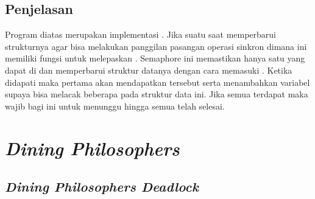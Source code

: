 \documentclass[11pt,a4paper]{article}
\begin{document}
    \subsection{Penjelasan}
    Program diatas merupakan implementasi . Jika  suatu saat memperbarui strukturnya agar bisa melakukan panggilan pasangan operasi sinkron  dimana ini memiliki fungsi untuk melepaskan . Semaphore  ini memastikan hanya satu  yang dapat di  dan memperbarui struktur datanya dengan cara memasuki . Ketika  didapati maka  pertama akan mendapatkan  tersebut serta menambahkan variabel  supaya bisa melacak beberapa  pada struktur data ini. Jika semua  terdapat  maka wajib bagi  ini untuk menunggu hingga semua  telah selesai. 

\section{\textit{Dining Philosophers}}
\subsection{\textit{Dining Philosophers Deadlock}}
\end{document}
